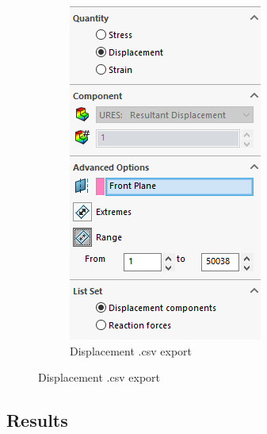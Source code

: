 \documentclass[12pt, letterpaper]{article}
\begin{document}
\begin{figure}[H]
\begin{subfigure}[t]{.3\linewidth}
	\end{subfigure}
	\begin{subfigure}[t]{.3\linewidth}
		\caption{Displacement .csv export}
		\includegraphics[width=\linewidth]{./procedure/displacement-list}
	\end{subfigure}
\end{figure}

\subsection{Results}
\label{sec:results}
\end{document}
